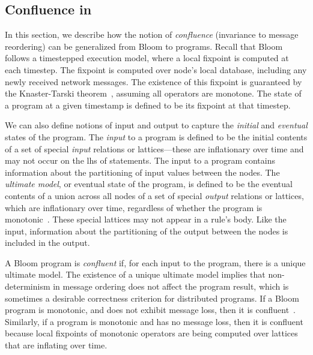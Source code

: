 \subsection{Confluence in \lang}
In this section, we describe how the notion of \emph{confluence} (invariance to
message reordering) can be generalized from Bloom to \lang programs.  Recall
that Bloom follows a timestepped execution model, where a local fixpoint is
computed at each timestep.  The fixpoint is computed over node's local database,
including any newly received network messages. The existence of this fixpoint is
guaranteed by the Knaster-Tarski theorem~\cite{Tarski1955}, assuming all \lang
operators are monotone.  The state of a program at a given timestamp is defined
to be its fixpoint at that timestep.

We can also define notions of input and output to capture the {\em initial} and
{\em eventual} states of the program.  The {\em input} to a \lang program is
defined to be the initial contents of a set of special {\em input} relations or
lattices---these are inflationary over time and may not occur on the lhs of
statements.  The input to a program contains information about the partitioning
of input values between the nodes.  The {\em ultimate model}, or eventual state
of the program, is defined to be the eventual contents of a union across all
nodes of a set of special {\em output} relations or lattices, which are
inflationary over time, regardless of whether the \lang program is
monotonic~\cite{dedalus-pods12-tr}.  These special lattices may not appear in a
rule's body.  Like the input, information about the partitioning of the output
between the nodes is included in the output.

A Bloom program is {\em confluent} if, for each input to the program, there is a
unique ultimate model.  The existence of a unique ultimate model implies that
non-determinism in message ordering does not affect the program result, which is
sometimes a desirable correctness criterion for distributed programs.  If a
Bloom program is monotonic, and does not exhibit message loss, then it is
confluent~\cite{dedalus-pods12-tr}.  Similarly, if a \lang program is monotonic
and has no message loss, then it is confluent because local fixpoints of
monotonic operators are being computed over lattices that are inflating over
time.
